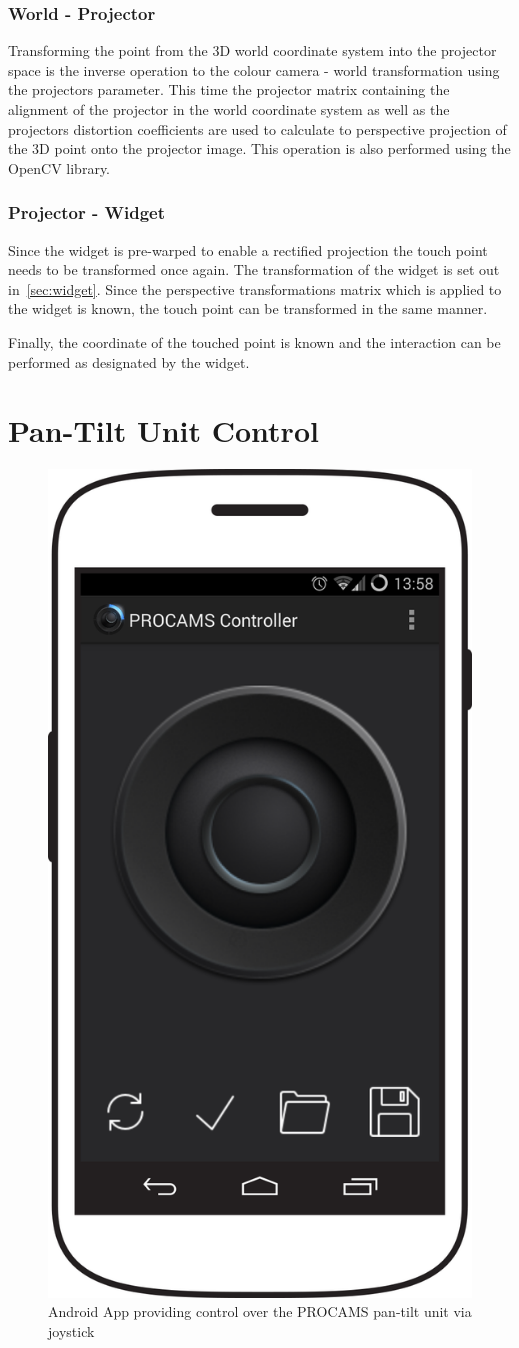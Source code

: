 \subsubsection{World - Projector}
Transforming the point from the  3D world coordinate system into the projector space is the inverse operation to the colour camera - world transformation using the projectors parameter. This time the projector matrix containing the alignment of the projector in the world coordinate system as well as the projectors distortion coefficients are used to calculate to perspective projection of the 3D point onto the projector image. This operation is also performed using the  OpenCV library. 

\subsubsection{Projector - Widget}
Since the widget is pre-warped to enable a rectified projection the touch point needs to be transformed once again.
The transformation of the widget is set out in~\autoref{sec:widget}. Since the perspective transformations matrix which is applied to the widget is known, the touch point can be transformed in the same manner. 

Finally, the coordinate of the touched point is known and the interaction can be performed as designated by the widget. 
	
\section{Pan-Tilt Unit Control}
\begin{figure}
		\vspace{-2em}
  		\begin{center}
                	\includegraphics[width=.42\textwidth]{images/software/android_template.png}
  		\end{center}
		  \vspace{-1em}
		  \setcapindent{0pt}
		  \captionsetup{width=0.42\textwidth}
\caption{Android App providing control over the PROCAMS pan-tilt unit via joystick}
	\label{img:appUi}
       \vspace{-3em}    
\end{figure}

